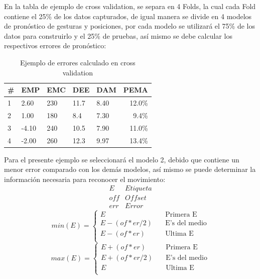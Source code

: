 \documentclass[twoside,twocolumn]{article}
\begin{document}
\medbreak 
En la tabla de ejemplo de cross validation, se separa en 4 Folds, la cual cada Fold contiene el 25\% de los datos capturados, de igual manera se divide en 4 modelos de pronóstico de gesturas y posiciones, por cada modelo se utilizará el 75\% de los datos para construirlo y el 25\% de pruebas, así mismo se debe calcular los respectivos errores de pronóstico:
\begin{table}[H]
\caption{Ejemplo de errores calculado en cross validation}
\centering
\begin{tabular}{lllllr}
\toprule
\# & EMP & EMC & DEE & DAM & PEMA \\
\midrule
1 & 2.60  & 230 & 11.7 & 8.40 & 12.0\% \\
2 & 1.00  & 180 & 8.4  & 7.30 & 9.4\%  \\
3 & -4.10 & 240 & 10.5 & 7.90 & 11.0\% \\
4 & -2.00 & 260 & 12.3 & 9.97 & 13.4\% \\
\bottomrule
\end{tabular}
\end{table}
\medbreak 
Para el presente ejemplo se seleccionará el modelo 2, debido que contiene un menor error comparado con los demás modelos, así mismo se puede determinar la información necesaria para reconocer el movimiento:
\[
 \begin{matrix}
  E & Etiqueta \\
  off & Offset \\
  err & Error
 \end{matrix}
\]
\[ min(E) =
  \begin{cases}
    E               & \quad \text{Primera E}\\
    E-(of*er/2)     & \quad \text{E's del medio}\\
    E-(of*er)       & \quad \text{Ultima E}\\
  \end{cases}
\]
\[ max(E) =
  \begin{cases}
    E+(of*er)       & \quad \text{Primera E}\\
    E+(of*er/2)     & \quad \text{E's del medio}\\
    E               & \quad \text{Ultima E}\\
  \end{cases}
\]
\end{document}
